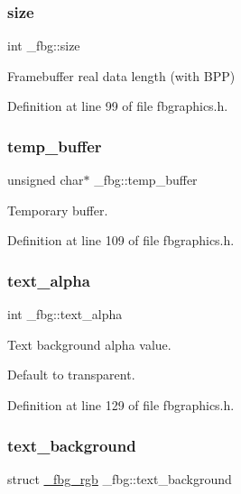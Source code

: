 \subsubsection{\texorpdfstring{size}{size}}
{\footnotesize\ttfamily int \+\_\+fbg\+::size}



Framebuffer real data length (with B\+PP) 



Definition at line 99 of file fbgraphics.\+h.

\mbox{\label{struct__fbg_a0463af9bf583afe770b822c1fbb9a24d}} 
\subsubsection{\texorpdfstring{temp\+\_\+buffer}{temp\_buffer}}
{\footnotesize\ttfamily unsigned char$\ast$ \+\_\+fbg\+::temp\+\_\+buffer}



Temporary buffer. 



Definition at line 109 of file fbgraphics.\+h.

\mbox{\label{struct__fbg_a870987786121c51135f20b630d731abd}} 
\subsubsection{\texorpdfstring{text\+\_\+alpha}{text\_alpha}}
{\footnotesize\ttfamily int \+\_\+fbg\+::text\+\_\+alpha}



Text background alpha value. 

Default to transparent. 

Definition at line 129 of file fbgraphics.\+h.

\mbox{\label{struct__fbg_afd34a8de5a853e915bd101f11d44cf67}} 
\subsubsection{\texorpdfstring{text\+\_\+background}{text\_background}}
{\footnotesize\ttfamily struct \mbox{\hyperlink{fbgraphics_8h_struct__fbg__rgb}{\+\_\+fbg\+\_\+rgb}} \+\_\+fbg\+::text\+\_\+background}




